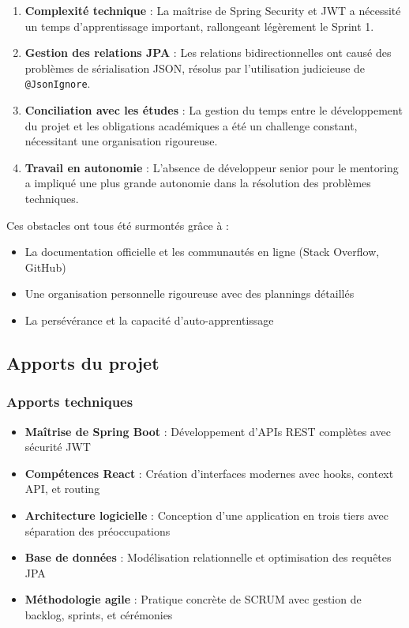 \documentclass[12pt,a4paper]{report}
\begin{document}
\begin{enumerate}[leftmargin=1cm]
    \item \textbf{Complexité technique} : La maîtrise de Spring Security et JWT a nécessité un temps d'apprentissage important, rallongeant légèrement le Sprint 1.
    
    \item \textbf{Gestion des relations JPA} : Les relations bidirectionnelles ont causé des problèmes de sérialisation JSON, résolus par l'utilisation judicieuse de \texttt{@JsonIgnore}.
    
    \item \textbf{Conciliation avec les études} : La gestion du temps entre le développement du projet et les obligations académiques a été un challenge constant, nécessitant une organisation rigoureuse.
    
    \item \textbf{Travail en autonomie} : L'absence de développeur senior pour le mentoring a impliqué une plus grande autonomie dans la résolution des problèmes techniques.
\end{enumerate}

Ces obstacles ont tous été surmontés grâce à :

\begin{itemize}[leftmargin=1cm]
    \item La documentation officielle et les communautés en ligne (Stack Overflow, GitHub)
    \item Une organisation personnelle rigoureuse avec des plannings détaillés
    \item La persévérance et la capacité d'auto-apprentissage
\end{itemize}

\subsection*{Apports du projet}

\subsubsection{Apports techniques}

\begin{itemize}[leftmargin=1cm]
    \item \textbf{Maîtrise de Spring Boot} : Développement d'APIs REST complètes avec sécurité JWT
    \item \textbf{Compétences React} : Création d'interfaces modernes avec hooks, context API, et routing
    \item \textbf{Architecture logicielle} : Conception d'une application en trois tiers avec séparation des préoccupations
    \item \textbf{Base de données} : Modélisation relationnelle et optimisation des requêtes JPA
    \item \textbf{Méthodologie agile} : Pratique concrète de SCRUM avec gestion de backlog, sprints, et cérémonies
\end{itemize}
\end{document}
